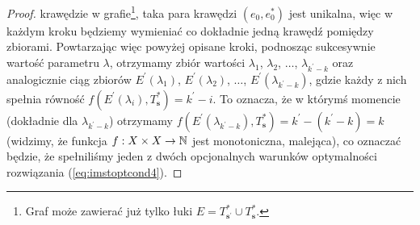 {\begin{proof}
krawędzie w grafie\footnote{Graf może zawierać już tylko łuki $E = T^{\ast}_{\textbf{s}^{\prime}} \cup T^{\ast}_{\textbf{s}}$.}, taka para krawędzi $\left( e_{0}, e_{0}^{\ast} \right)$ jest unikalna, więc w każdym kroku będziemy wymieniać co dokładnie jedną krawędź pomiędzy zbiorami. Powtarzając więc powyżej opisane kroki, podnosząc sukcesywnie wartość parametru $\lambda$, otrzymamy zbiór wartości $\lambda_{1}$, $\lambda_{2}$, $\dots$, $\lambda_{k^{\prime} - k}$ oraz analogicznie ciąg zbiorów $E^{\prime} \left( \lambda_{1} \right)$, $E^{\prime} \left( \lambda_{2} \right)$, $\dots$, $E^{\prime} \left( \lambda_{k^{\prime} - k} \right)$, gdzie każdy z nich spełnia równość $f \left( E^{\prime} \left( \lambda_{i} \right), T^{\ast}_{\textbf{s}} \right) = k^{\prime} - i$. To oznacza, że w którymś momencie (dokładnie dla $\lambda_{k^{\prime} - k}$) otrzymamy $f \left( E^{\prime} \left( \lambda_{k^{\prime} - k} \right), T^{\ast}_{\textbf{s}} \right) = k^{\prime} - \left( k^{\prime} - k \right) = k$ (widzimy, że funkcja $f : X \times X \rightarrow \mathbb{N}$ jest monotoniczna, malejąca), co oznaczać będzie, że spełniliśmy jeden z dwóch opcjonalnych warunków optymalności rozwiązania (\ref{eq:imstoptcond4}).
\end{proof}

}
